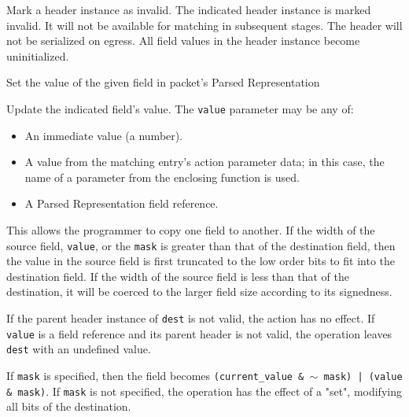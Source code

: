 \documentclass[12pt]{article}
\begin{document}

{ %
Mark a header instance as invalid.
}
{ %
}
{ %
The indicated  header instance is marked invalid. It will not be available for
matching in subsequent \matchaction stages. The header will not be serialized
on egress. All field values in the header instance become uninitialized.
}


{ %
Set the value of the given field in packet's Parsed Representation
}
{ %
}
{ %
Update the indicated field's value. The \texttt{value} parameter may be any of:

\begin{itemize}
\item
An immediate value (a number).
\item
A value from the matching entry's action parameter data; in this case, the 
name of a parameter from the enclosing function is used.
\item
A Parsed Representation field reference.
\end{itemize}


This allows the programmer to copy one field to another. If the width of 
the source field, \texttt{value}, or the \texttt{mask} is greater than that of the destination 
field, then the value in the source field is first truncated to the low order 
bits to fit into the destination field. If the width of the source field 
is less than that of the destination, it will be coerced to the larger field 
size according to its signedness.

If the parent header instance of \texttt{dest} is not valid, the action has no effect. 
If \texttt{value} is a field reference and its parent header is not valid, the operation leaves \texttt{dest} with an undefined value.

If \texttt{mask} is specified, then the field becomes \texttt{(current_value \& $\sim$ mask) | 
(value \& mask)}.  If \texttt{mask} is not specified, the operation has the effect 
of a "set", modifying all bits of the destination. 

}
\end{document}
